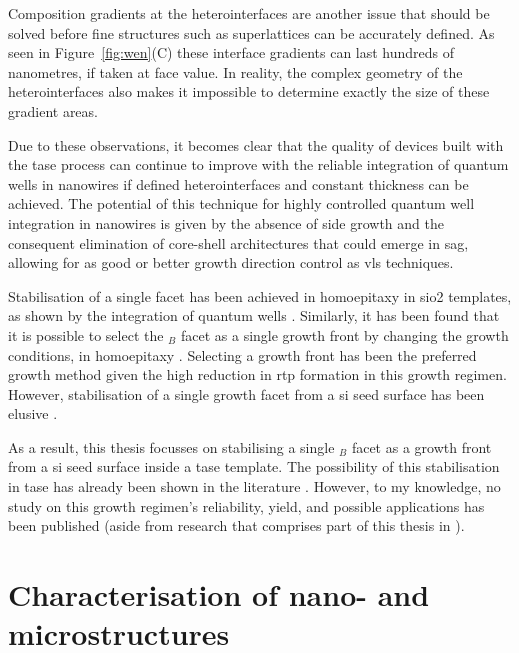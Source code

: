Composition gradients at the heterointerfaces are another issue that should be solved before fine structures such as superlattices can be accurately defined. As seen in Figure~\ref{fig:wen}(C) these interface gradients can last hundreds of nanometres, if taken at face value. In reality, the complex geometry of the heterointerfaces also makes it impossible to determine exactly the size of these gradient areas.

Due to these observations, it becomes clear that the quality of devices built with the \acs{tase} process can continue to improve with the reliable integration of quantum wells in nanowires if defined heterointerfaces and constant thickness can be achieved. The potential of this technique for highly controlled quantum well integration in nanowires is given by the absence of side growth and the consequent elimination of core-shell architectures that could emerge in \acs{sag}, allowing for as good or better growth direction control as \acs{vls} techniques.

Stabilisation of a single  facet has been achieved in homoepitaxy in \acs{sio2} templates, as shown by the integration of quantum wells \cite{Brunelli2019}. Similarly, it has been found that it is possible to select the \(_B\) facet as a single growth front by changing the growth conditions, in homoepitaxy \cite{Goswami2020}. Selecting a  growth front has been the preferred growth method given the high reduction in \acs{rtp} formation in this growth regimen. However, stabilisation of a single  growth facet from a  \acl{si} seed surface has been elusive \cite{Knoedler2017}.

As a result, this thesis focusses on stabilising a single \(_B\) facet as a growth front from a  \acl{si} seed surface inside a \acs{tase} template. The possibility of this stabilisation in \acs{tase} has already been shown in the literature \cite{Ritter2021, Borg2015}. However, to my knowledge, no study on this growth regimen's reliability, yield, and possible applications has been published (aside from research that comprises part of this thesis in \cite{Brugnolotto2023, Brugnolotto2023_2}).



\section{Characterisation of nano- and microstructures}

